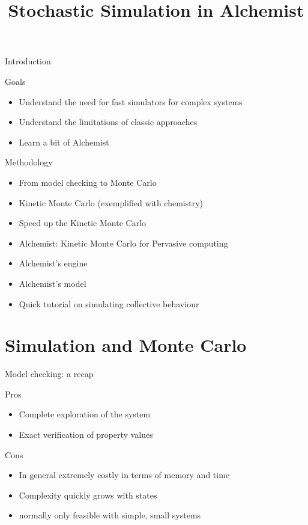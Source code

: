 \documentclass[presentation]{beamer}
\title[Simulation]{Stochastic Simulation in Alchemist}
\begin{document}
\frame[label=coverpage]{\titlepage}

\newcommand{\ov}[1]{\(\overline{\texttt{#1}}\)}
\newcommand{\pedix}[1]{\({}_{\texttt{#1}}\)}
\newcommand{\apedix}[1]{\({}^{\texttt{#1}}\)}
\newcommand{\p}[0]{\('\)}
\newcommand{\xt}[1]{\texttt{#1}}
\newcommand{\bnfs}[0] {\;|\;}
\newcommand{\opar}[0] {\,||\,}
\newcommand{\temp}[1] {#1}

\begin{frame}{Introduction}
 \begin{block}{Goals}
  \begin{itemize}
        \item Understand the need for fast simulators for complex systems
        \item Understand the limitations of classic approaches
        \item Learn a bit of Alchemist
  \end{itemize}
 \end{block}
 \begin{block}{Methodology}
  \begin{itemize}
        \item From model checking to Monte Carlo
        \item Kinetic Monte Carlo (exemplified with chemistry)
        \item Speed up the Kinetic Monte Carlo
        \item Alchemist: Kinetic Monte Carlo for Pervasive computing
        \item Alchemist's engine
        \item Alchemist's model
        \item Quick tutorial on simulating collective behaviour
  \end{itemize}
 \end{block}
\end{frame}

\section{Simulation and Monte Carlo}
\begin{frame}{Model checking: a recap}
 \begin{block}{Pros}
  \begin{itemize}
        \item Complete exploration of the system
        \item Exact verification of property values
  \end{itemize}
 \end{block}
 \begin{block}{Cons}
  \begin{itemize}
        \item In general extremely costly in terms of memory and time
        \item Complexity quickly grows with states
        \item normally only feasible with simple, small systems
  \end{itemize}
 \end{block}
\end{frame}
\end{document}
